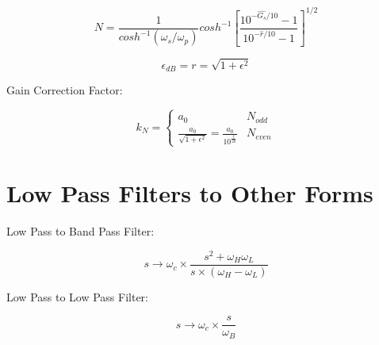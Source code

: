 \documentclass{article}
\begin{document}
$$N = \frac{1}{cosh^{-1}(\omega_{s}/\omega_{p})}cosh^{-1}\left[\frac{10^{-\hat{G_{s}}/10}-1}{10^{-\hat{r}/10}-1}\right]^{1/2}$$

$$\epsilon_{dB} = r = \sqrt{1 + \epsilon^{2}}$$

Gain Correction Factor:

$$k_N = \begin{cases} 
    a_0 & N_{odd}\\ 
    \frac{a_0}{\sqrt{1+ \epsilon^2}} = \frac{a_0}{10^{\frac{\hat{r}}{20}}} & N_{even}
\end{cases}
$$

\section{Low Pass Filters to Other Forms}

Low Pass to Band Pass Filter:

$$s \rightarrow \omega_c \times \frac{s^2 + \omega_H \omega_L}{s\times (\omega_H - \omega_L)}$$

Low Pass to Low Pass Filter:

$$s \rightarrow \omega_c \times \frac{s}{\omega_B}$$
\end{document}
